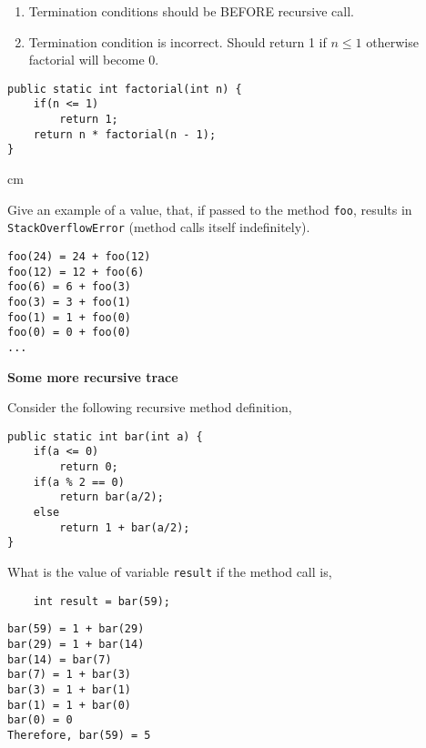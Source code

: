 \begin{questions}
\begin{solution}
\begin{enumerate}
\item Termination conditions should be BEFORE recursive call.
\item Termination condition is incorrect. Should return 1 if $n \leq 1$ otherwise factorial will become 0.
\end{enumerate}

\begin{lstlisting}
public static int factorial(int n) {
	if(n <= 1)
		return 1;
	return n * factorial(n - 1);
}
\end{lstlisting}
	
\end{solution}

 cm 

Give an example of a value, that, if passed to the method \texttt{foo}, results in \texttt{StackOverflowError} (method calls itself indefinitely).

\begin{solution}
\begin{verbatim}
foo(24) = 24 + foo(12)
foo(12) = 12 + foo(6)
foo(6) = 6 + foo(3)
foo(3) = 3 + foo(1)
foo(1) = 1 + foo(0)
foo(0) = 0 + foo(0)
...	
\end{verbatim}
\end{solution}

\newpage

\question  \textbf{Some more recursive trace} \vskip 0.5cm

Consider the following recursive method definition,

\begin{lstlisting}
public static int bar(int a) {
	if(a <= 0)
		return 0;
	if(a % 2 == 0)
		return bar(a/2);
	else
		return 1 + bar(a/2);
}
\end{lstlisting}

What is the value of variable \texttt{result} if the method call is,

\begin{lstlisting}
	int result = bar(59);
\end{lstlisting}

\begin{solution}
\begin{verbatim}
bar(59) = 1 + bar(29)
bar(29) = 1 + bar(14)
bar(14) = bar(7)
bar(7) = 1 + bar(3)
bar(3) = 1 + bar(1)
bar(1) = 1 + bar(0)
bar(0) = 0
Therefore, bar(59) = 5
\end{verbatim}
\end{solution}


\end{questions}
